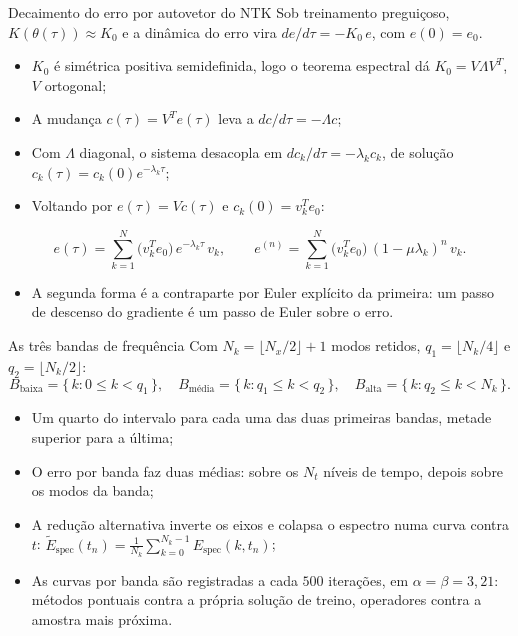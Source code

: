 \begin{frame}{Decaimento do erro por autovetor do NTK}
  Sob treinamento preguiçoso, $K(\theta(\tau)) \approx K_0$ e a dinâmica do erro
  vira $de/d\tau = -K_0\,e$, com $e(0) = e_0$.
  \begin{itemize}
    \item $K_0$ é simétrica positiva semidefinida, logo o teorema espectral
          \parencite{strang2006, golub2013} dá $K_0 = V\Lambda V^{T}$, $V$ ortogonal;
    \item A mudança $c(\tau) = V^{T} e(\tau)$ leva a $dc/d\tau = -\Lambda c$;
    \item Com $\Lambda$ diagonal, o sistema desacopla em $dc_k/d\tau = -\lambda_k c_k$,
          de solução $c_k(\tau) = c_k(0)e^{-\lambda_k\tau}$;
    \item Voltando por $e(\tau) = Vc(\tau)$ e $c_k(0) = v_k^{T}e_0$:
  \end{itemize}
  \begin{equation*}
    e(\tau) = \sum_{k=1}^{N} \bigl(v_k^{T} e_0\bigr)\,e^{-\lambda_k\tau}\,v_k ,
    \qquad
    e^{(n)} = \sum_{k=1}^{N} \bigl(v_k^{T} e_0\bigr)\,(1-\mu\lambda_k)^{n}\,v_k .
  \end{equation*}
  \begin{itemize}
    \item A segunda forma é a contraparte por Euler explícito da primeira: um passo
          de descenso do gradiente é um passo de Euler sobre o erro.
  \end{itemize}
\end{frame}

\begin{frame}{As três bandas de frequência}
  Com $N_k = \lfloor N_x/2 \rfloor + 1$ modos retidos, $q_1 = \lfloor N_k/4 \rfloor$
  e $q_2 = \lfloor N_k/2 \rfloor$:
  \begin{equation*}
    B_{\text{baixa}} = \{\, k : 0 \le k < q_1 \,\}, \quad
    B_{\text{média}} = \{\, k : q_1 \le k < q_2 \,\}, \quad
    B_{\text{alta}}  = \{\, k : q_2 \le k < N_k \,\}.
  \end{equation*}
  \begin{itemize}
    \item Um quarto do intervalo para cada uma das duas primeiras bandas, metade
          superior para a última;
    \item O erro por banda faz duas médias: sobre os $N_t$ níveis de tempo, depois
          sobre os modos da banda;
    \item A redução alternativa inverte os eixos e colapsa o espectro numa curva
          contra $t$:
          $\widetilde{E}_{\text{spec}}(t_n) = \frac{1}{N_k}\sum_{k=0}^{N_k-1} E_{\text{spec}}(k,t_n)$;
    \item As curvas por banda são registradas a cada $500$ iterações, em
          $\alpha = \beta = 3{,}21$: métodos pontuais contra a própria solução de
          treino, operadores contra a amostra mais próxima.
  \end{itemize}
\end{frame}

